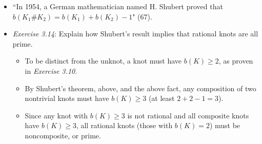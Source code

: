 \documentclass[titlepage]{article}
\numberwithin{figure}{section}
\numberwithin{table}{section}
\numberwithin{equation}{section}
\newcommand{\dq}[2]{``#1" (#2).}
\begin{document}
\begin{itemize}
\begin{itemize}
$$    \end{itemize}
    \item \dq{In 1954, a German mathematician named H. Shubert proved that $b(K_1\#K_2)=b(K_1)+b(K_2)-1$}{67}
    \item \emph{Exercise 3.14}: Explain how Shubert's result implies that rational knots are all prime.
    \begin{itemize}
        \item To be distinct from the unknot, a knot must have $b(K)\geq 2$, as proven in \emph{Exercise 3.10}.
        \item By Shubert's theorem, above, and the above fact, any composition of two nontrivial knots must have $b(K)\geq 3$ (at least $2+2-1=3$).
        \item Since any knot with $b(K)\geq 3$ is not rational and all composite knots have $b(K)\geq 3$, all rational knots (those with $b(K)=2$) must be noncomposite, or prime.
    \end{itemize}
\end{itemize}
\end{document}
